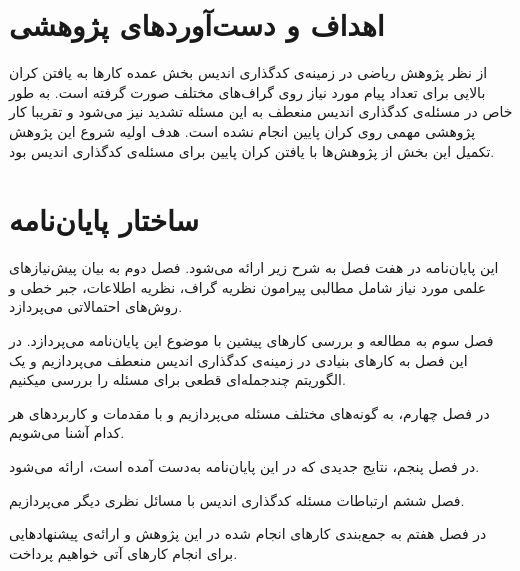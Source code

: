 \section{اهداف و دست‌آورد‌های پژوهشی}
از نظر پژوهش ریاضی در زمینه‌ی کدگذاری اندیس بخش عمده کارها به یافتن کران بالایی برای تعداد پیام مورد نیاز روی گراف‌های مختلف صورت گرفته است. به طور خاص در مسئله‌ی کدگذاری اندیس منعطف به این مسئله تشدید نیز می‌شود و تقریبا کار پژوهشی‌ مهمی روی کران پایین انجام نشده است. هدف اولیه شروع این پژوهش تکمیل این بخش از پژوهش‌ها با یافتن کران پایین برای مسئله‌ی کدگذاری اندیس بود.

\section{ساختار پایان‌نامه}

این پایان‌نامه در هفت فصل به شرح زیر ارائه می‌شود.
فصل دوم به بیان پیش‌نیازهای علمی مورد نیاز شامل مطالبی پیرامون نظریه گراف، نظریه اطلاعات، جبر خطی و روش‌های احتمالاتی  می‌پردازد.

فصل سوم به مطالعه و بررسی کارهای پیشین با موضوع این پایان‌نامه می‌پردازد. در این فصل به کارهای بنیادی 
در زمینه‌ی کدگذاری اندیس منعطف می‌پردازیم و یک الگوریتم چندجمله‌ای قطعی برای مسئله را بررسی میکنیم.

در فصل چهارم، به گونه‌های مختلف مسئله می‌پردازیم و با مقدمات و کاربردهای هر کدام آشنا می‌شویم.

در فصل پنجم، نتایج جدیدی که در این پایان‌نامه به‌دست آمده است، ارائه می‌شود.

فصل ششم ارتباطات مسئله کدگذاری اندیس با مسائل نظری دیگر می‌پردازیم.

در فصل هفتم به جمع‌بندی کارهای انجام شده در این پژوهش و ارائه‌ی پیشنهادهایی برای انجام کارهای آتی خواهیم پرداخت.